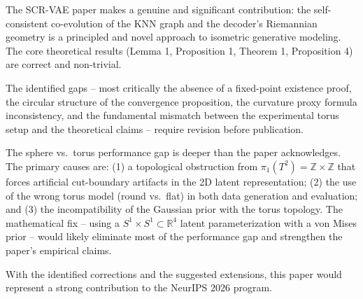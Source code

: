 \documentclass[11pt]{article}
\newcommand{\R}{\mathbb{R}}
\newcommand{\Z}{\mathbb{Z}}
\begin{document}
The SCR-VAE paper makes a genuine and significant contribution: the self-consistent
co-evolution of the KNN graph and the decoder's Riemannian geometry is a principled
and novel approach to isometric generative modeling. The core theoretical results
(Lemma 1, Proposition 1, Theorem 1, Proposition 4) are correct and non-trivial.

The identified gaps -- most critically the absence of a fixed-point existence proof,
the circular structure of the convergence proposition, the curvature proxy formula
inconsistency, and the fundamental mismatch between the experimental torus setup
and the theoretical claims -- require revision before publication.

The sphere vs.\ torus performance gap is deeper than the paper acknowledges. The
primary causes are: (1) a topological obstruction from $\pi_1(T^2) = \Z \times \Z$
that forces artificial cut-boundary artifacts in the 2D latent representation;
(2) the use of the wrong torus model (round vs.\ flat) in both data generation
and evaluation; and (3) the incompatibility of the Gaussian prior with the torus
topology. The mathematical fix -- using a $S^1 \times S^1 \subset \R^4$ latent
parameterization with a von Mises prior -- would likely eliminate most of the
performance gap and strengthen the paper's empirical claims.

With the identified corrections and the suggested extensions, this paper would
represent a strong contribution to the NeurIPS 2026 program.
\end{document}
